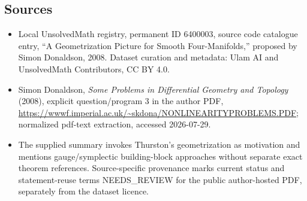 \documentclass[11pt]{article}
\begin{document}
\subsection{Sources}
\begin{itemize}
\item Local UnsolvedMath registry, permanent ID 6400003, source code catalogue entry, ``A Geometrization Picture for Smooth Four-Manifolds,'' proposed by Simon Donaldson, 2008. Dataset curation and metadata: Ulam AI and UnsolvedMath Contributors, CC BY 4.0.
\item Simon Donaldson, \emph{Some Problems in Differential Geometry and Topology} (2008), explicit question/program 3 in the author PDF, \url{https://wwwf.imperial.ac.uk/~skdona/NONLINEARITYPROBLEMS.PDF}; normalized pdf-text extraction, accessed 2026-07-29.
\item The supplied summary invokes Thurston's geometrization as motivation and mentions gauge/symplectic building-block approaches without separate exact theorem references. Source-specific provenance marks current status and statement-reuse terms NEEDS\_REVIEW for the public author-hosted PDF, separately from the dataset licence.
\end{itemize}
\end{document}
